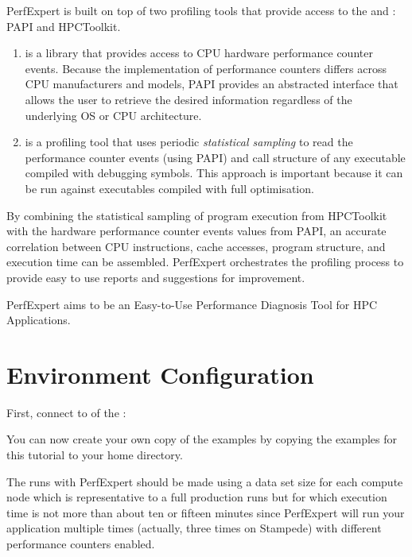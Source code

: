 PerfExpert is built on top of two profiling tools that provide access to the  and : PAPI and HPCToolkit.

\begin{enumerate}
  \item  {} is a library that provides access to CPU hardware performance counter events. Because the implementation of performance counters differs across CPU manufacturers and models, PAPI provides an abstracted interface that allows the user to retrieve the desired information regardless of the underlying OS or CPU architecture.
  \item  {} is a profiling tool that uses periodic \emph{statistical sampling} to read the performance counter events (using PAPI) and call structure of any executable compiled with debugging symbols. This approach is important because it can be run against executables compiled with full optimisation.
\end{enumerate}

By combining the statistical sampling of program execution from HPCToolkit with the hardware performance counter events values from PAPI, an accurate correlation between CPU instructions, cache accesses, program structure, and execution time can be assembled. PerfExpert orchestrates the profiling process to provide easy to use reports and suggestions for improvement.

 PerfExpert aims to be an Easy-to-Use Performance Diagnosis Tool for HPC Applications.

\section{Environment Configuration}
\label{sec:Environment_Configuration}

First, connect to \hpcname of the \university:
\begin{prompt}
\end{prompt}

You can now create your own copy of the examples by copying the examples for this tutorial to your home directory.
\begin{prompt}
\end{prompt}

The runs with PerfExpert should be made using a data set size for each compute node which is representative to a full production runs but for which execution time is not more than about ten or fifteen minutes since PerfExpert will run your application multiple times (actually, three times on Stampede) with different performance counters enabled.

